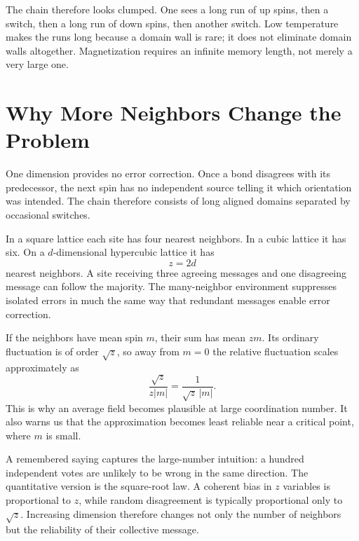 The chain therefore looks clumped. One sees a long run of up spins, then a switch, then a long run of down spins, then another switch. Low temperature makes the runs long because a domain wall is rare; it does not eliminate domain walls altogether. Magnetization requires an infinite memory length, not merely a very large one.

\section{Why More Neighbors Change the Problem}

One dimension provides no error correction. Once a bond disagrees with its predecessor, the next spin has no independent source telling it which orientation was intended. The chain therefore consists of long aligned domains separated by occasional switches.

In a square lattice each site has four nearest neighbors. In a cubic lattice it has six. On a \(d\)-dimensional hypercubic lattice it has
\begin{equation}
z=2d
\end{equation}
nearest neighbors. A site receiving three agreeing messages and one disagreeing message can follow the majority. The many-neighbor environment suppresses isolated errors in much the same way that redundant messages enable error correction.

If the neighbors have mean spin \(m\), their sum has mean \(zm\). Its ordinary fluctuation is of order \(\sqrt{z}\), so away from \(m=0\) the relative fluctuation scales approximately as
\begin{equation}
\frac{\sqrt{z}}{z|m|}
=\frac{1}{\sqrt{z}\,|m|}.
\end{equation}
This is why an average field becomes plausible at large coordination number. It also warns us that the approximation becomes least reliable near a critical point, where \(m\) is small.

A remembered saying captures the large-number intuition: a hundred independent votes are unlikely to be wrong in the same direction. The quantitative version is the square-root law. A coherent bias in \(z\) variables is proportional to \(z\), while random disagreement is typically proportional only to \(\sqrt{z}\). Increasing dimension therefore changes not only the number of neighbors but the reliability of their collective message.

\begin{classroomqa}
\end{classroomqa}

